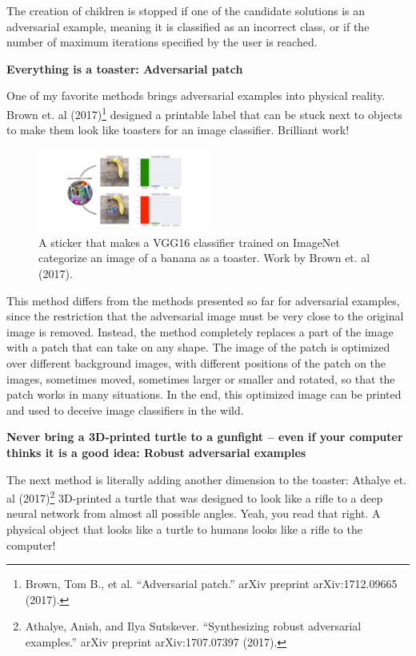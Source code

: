 \documentclass[12pt,]{krantz}
\begin{document}
The creation of children is stopped if one of the candidate solutions is
an adversarial example, meaning it is classified as an incorrect class,
or if the number of maximum iterations specified by the user is reached.

\textbf{Everything is a toaster: Adversarial patch}

One of my favorite methods brings adversarial examples into physical
reality. Brown et. al (2017)\footnote{Brown, Tom B., et al.
  ``Adversarial patch.'' arXiv preprint arXiv:1712.09665 (2017).}
designed a printable label that can be stuck next to objects to make
them look like toasters for an image classifier. Brilliant work!

\begin{figure}

{\centering \includegraphics[width=0.5\textwidth]{images/adversarial-toaster} 

}

\caption{A sticker that makes a VGG16 classifier trained on ImageNet categorize an image of a banana as a toaster. Work by Brown et. al (2017).}\label{fig:adversarial-toaster}
\end{figure}

This method differs from the methods presented so far for adversarial
examples, since the restriction that the adversarial image must be very
close to the original image is removed. Instead, the method completely
replaces a part of the image with a patch that can take on any shape.
The image of the patch is optimized over different background images,
with different positions of the patch on the images, sometimes moved,
sometimes larger or smaller and rotated, so that the patch works in many
situations. In the end, this optimized image can be printed and used to
deceive image classifiers in the wild.

\textbf{Never bring a 3D-printed turtle to a gunfight -- even if your
computer thinks it is a good idea: Robust adversarial examples}

The next method is literally adding another dimension to the toaster:
Athalye et. al (2017)\footnote{Athalye, Anish, and Ilya Sutskever.
  ``Synthesizing robust adversarial examples.'' arXiv preprint
  arXiv:1707.07397 (2017).} 3D-printed a turtle that was designed to
look like a rifle to a deep neural network from almost all possible
angles. Yeah, you read that right. A physical object that looks like a
turtle to humans looks like a rifle to the computer!
\end{document}
